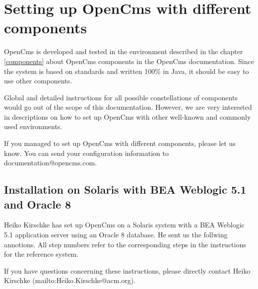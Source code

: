 \section{Setting up OpenCms with different components}
OpenCms is developed and tested in the environment described in the
chapter \ref{components} about OpenCms components in the 
OpenCms documentation. Since the system is based on standards and
written 100\% in Java, it should be easy to use other components.

Global and detailed instructions for all possible constellations of components
would go out of the scope of this documentation. However, we are very
interested in descriptions on how to set up OpenCms with other
well-known and commonly used environments. 

If you managed to set up OpenCms with different components, please let us know. 
You can send your configuration information to documentation@opencms.com.

\subsection{Installation on Solaris with BEA Weblogic 5.1 and Oracle 8}
Heiko Kirschke has set up OpenCms on 
a Solaris system with a BEA Weblogic 5.1 application server using an
Oracle 8 database. He sent us the follwing annotions. All step numbers
refer to the corresponding steps in the instructions for the reference system.

If you have questions
concerning these instructions, please directly contact Heiko Kirschke 
(mailto:Heiko.Kirschke@acm.org).



